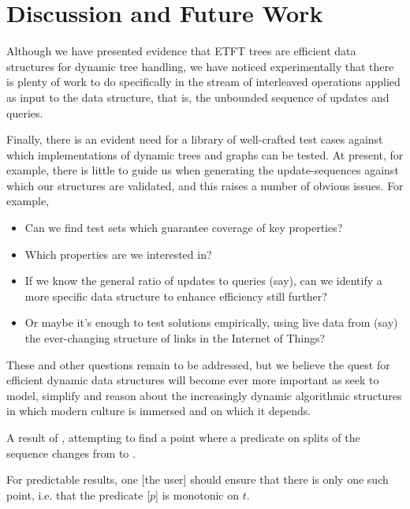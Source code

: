 \section{Discussion and Future Work} 
\label{sec:Concl} 
\label{sec:discussion}

Although we have presented evidence that ETFT trees are efficient data structures for dynamic tree handling, we have noticed experimentally that there is plenty of work to do specifically in the stream of interleaved operations applied as input to the data structure, that is, the unbounded sequence of updates and queries.

Finally, there is an evident need for a library of well-crafted test cases against which implementations of dynamic trees and graphs can be tested. At present, for example, there is little to guide us when generating the update-sequences against which our structures are validated, and this raises a number of obvious issues. For example,

\begin{itemize}
\item Can we find test sets which guarantee coverage of key properties?

\item Which properties are we interested in?

\item If we know the general ratio of updates to queries (say), can we identify a more specific data structure to enhance efficiency still further?

\item Or maybe it’s enough to test solutions empirically, using live data from (say) the ever-changing structure of links in the Internet of Things?

\end{itemize}

These and other questions remain to be addressed, but we believe the quest for efficient dynamic data structures will become ever more important as seek to model, simplify and reason about the increasingly dynamic algorithmic structures in which modern culture is immersed and on which it depends.


\begin{displayquote}
A result of , attempting to find a point where a predicate on splits of the sequence changes from  to .

For predictable results, one [the user] should ensure that there is only one such point, i.e. that the predicate [$p$] is monotonic on $t$.
\end{displayquote}




